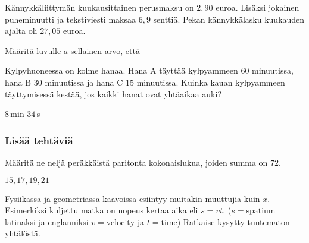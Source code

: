 \begin{tehtavasivu}
\begin{tehtava}
Kännykkäliittymän kuukausittainen perusmaksu on $2,90$ euroa. Lisäksi jokainen puheminuutti ja tekstiviesti maksaa $6,9$ senttiä. Pekan kännykkälasku kuukauden ajalta oli $27,05$ euroa.


	\begin{vastaus}
	\end{vastaus}
\end{tehtava}

\begin{tehtava}
Määritä luvulle $a$ sellainen arvo, että
\begin{vastaus}
\end{vastaus}
\end{tehtava}


\begin{tehtava}
Kylpyhuoneessa on kolme hanaa. Hana A täyttää kylpyammeen $60$ minuutissa, hana B $30$ minuutissa ja hana C $15$ minuutissa. Kuinka kauan kylpyammeen täyttymisessä kestää, jos kaikki hanat ovat yhtäaikaa auki?
\begin{vastaus}
$8$\,min $34$\,s
\end{vastaus}
\end{tehtava}

\subsubsection*{Lisää tehtäviä}

\begin{tehtava}
Määritä ne neljä peräkkäistä paritonta kokonaislukua, joiden summa on $72$.
	\begin{vastaus}
	 $15, 17, 19, 21$
	\end{vastaus}
\end{tehtava}


\begin{tehtava}
Fysiikassa ja geometriassa kaavoissa esiintyy muitakin muuttujia kuin $x$. Esimerkiksi kuljettu matka on nopeus kertaa aika eli $s=vt$. ($s= \text{spatium}$ latinaksi ja englanniksi $v= \text{velocity}$ ja $t= \text{time}$) Ratkaise kysytty tuntematon yhtälöstä.


\end{tehtava}
\end{tehtavasivu}
